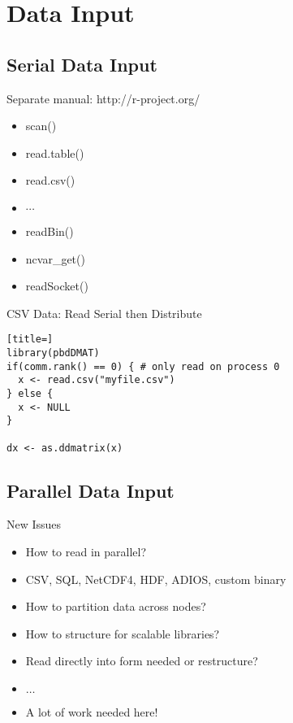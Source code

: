 \section[Input]{Data Input}
\makesubcontentsslides

\subsection{Serial Data Input}

\begin{frame}
\begin{block}{Separate manual: http://r-project.org/}
\begin{itemize}
\item scan()
\item read.table()
\item read.csv()
\item $\cdots$
\item readBin()
\item ncvar\_get()
\item readSocket()
\end{itemize}
\end{block}
\end{frame}

\begin{frame}
  \begin{exampleblock}{CSV Data: Read Serial then Distribute}\pause
\begin{lstlisting}[title=]
library(pbdDMAT)
if(comm.rank() == 0) { # only read on process 0
  x <- read.csv("myfile.csv")
} else {
  x <- NULL
}

dx <- as.ddmatrix(x)
\end{lstlisting}
  \end{exampleblock}
\end{frame}


\subsection{Parallel Data Input}

\begin{frame}
  \begin{block}{New Issues}\pause
    \begin{itemize}
    \item How to read in parallel?
    \item CSV, SQL, NetCDF4, HDF, ADIOS, custom binary
    \item How to partition data across nodes?
    \item How to structure for scalable libraries?
    \item Read directly into form needed or restructure?
    \item $\ldots$
    \item A lot of work needed here!
    \end{itemize}
  \end{block}
\end{frame}

